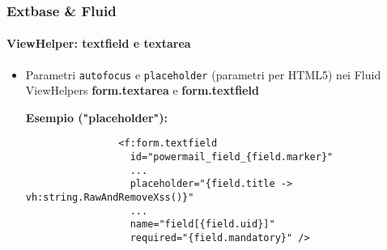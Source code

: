 
\begin{frame}[fragile]
	\frametitle{Extbase \& Fluid}
	\framesubtitle{ViewHelper: textfield e textarea}

	\begin{itemize}
		\item Parametri \texttt{autofocus} e \texttt{placeholder} (parametri per HTML5) nei Fluid ViewHelpers \textbf{form.textarea} e \textbf{form.textfield}\newline

			\smaller\textbf{Esempio ("placeholder"):}\normalsize
			\begin{lstlisting}
				<f:form.textfield
				  id="powermail_field_{field.marker}"
				  ...
				  placeholder="{field.title -> vh:string.RawAndRemoveXss()}"
				  ...
				  name="field[{field.uid}]"
				  required="{field.mandatory}" />
			\end{lstlisting}

	\end{itemize}

\end{frame}


